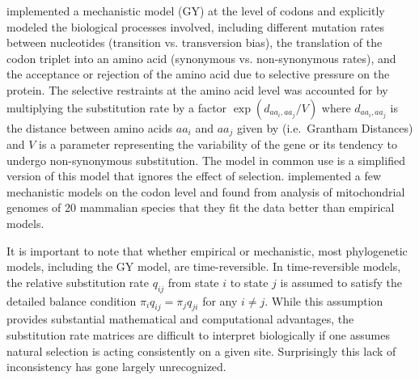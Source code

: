 \citet{GoldmanYang1994} implemented a mechanistic model (GY) at the level of codons and explicitly modeled the biological processes involved, including different mutation rates between nucleotides (transition vs. transversion bias), the translation of the codon triplet into an amino acid (synonymous vs. non-synonymous rates), and the acceptance or rejection of the amino acid due to selective pressure on the protein. 
The selective restraints at the amino acid level was accounted for by multiplying the substitution rate by a factor $\exp (d_{aa_i,aa_j}/V)$ where $d_{aa_i, aa_j}$ is the distance between amino acids $aa_i$ and $aa_j$ given by \citet{grantham1974} (i.e.~Grantham Distances) and $V$ is a parameter representing the variability of the gene or its tendency to undergo non-synonymous substitution.
The model in common use is a simplified version of this model that ignores the effect of selection.
\citet{yang1998models} implemented a few mechanistic models on the codon level and found from analysis of mitochondrial genomes of 20 mammalian species that they fit the data better than empirical models.




It is important to note that whether empirical or mechanistic, most phylogenetic models, including the GY model, are time-reversible. 
In time-reversible models, the relative substitution rate $q_{ij}$ from state $i$ to state $j$ is assumed to satisfy the detailed balance condition $\pi_{i} q_{ij} = \pi_j q_{ji}$ for any $i \ne j$.
While this assumption provides substantial mathematical and computational advantages, the substitution rate matrices are difficult to interpret biologically if one assumes natural selection is acting consistently on a given site.
Surprisingly this lack of inconsistency has gone largely unrecognized.



